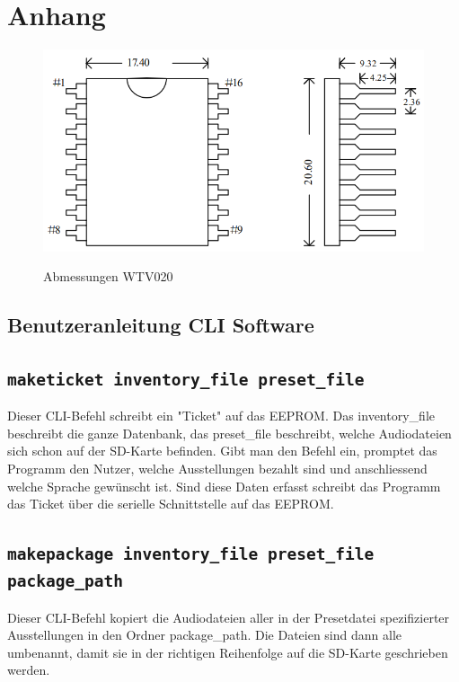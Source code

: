 \chapter{Anhang}
\label{Anhang}
\thispagestyle{fancy}  
\begin{figure}[h]
\centering
\includegraphics[scale=0.5]{Bilder/footprint_wtv020.png}
\label{fig:irgendesBild}
\caption[Abmessungen WTV020]{Abmessungen WTV020}
\end{figure}

\section{Benutzeranleitung CLI Software}
\section*{\texttt{maketicket inventory\_file preset\_file}}
Dieser CLI-Befehl schreibt ein "Ticket" auf das EEPROM.
Das inventory\_file beschreibt die ganze Datenbank, 
das preset\_file beschreibt, welche Audiodateien sich schon auf der SD-Karte befinden.
Gibt man den Befehl ein, promptet das Programm den Nutzer, 
welche Ausstellungen bezahlt sind und anschliessend welche Sprache gewünscht ist.
Sind diese Daten erfasst schreibt das Programm das Ticket über die serielle Schnittstelle auf das EEPROM.
\section*{\texttt{makepackage inventory\_file preset\_file package\_path}}
Dieser CLI-Befehl kopiert die Audiodateien aller in der Presetdatei spezifizierter Ausstellungen in den Ordner package\_path. 
Die Dateien sind dann alle umbenannt, damit sie in der richtigen Reihenfolge auf die SD-Karte geschrieben werden.
